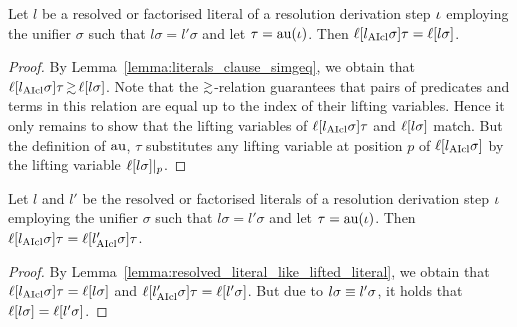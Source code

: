 \documentclass[,%
	draft=false,%
	numbers=noendperiod
	11pt,
	a4paper,
	oneside,%
	openany,
]{memoir}
\begin{document}
\begin{lemma}
	\label{lemma:resolved_literal_like_lifted_literal}
	Let $l$ be a resolved or factorised literal of a resolution derivation step $\iota$ employing the unifier $\sigma$ such that $l\sigma = l'\sigma$ and let $\tau =\nolinebreak \aiu(\inference)$.
	Then $\ell[l_{\operatorname{AIcl}}\sigma]\tau = \ell[l\sigma]$.
\end{lemma}
\begin{proof}
	By Lemma~\ref{lemma:literals_clause_simgeq}, we obtain that
	$\lifboth{l\cl\sigma}\tau \simgeq \lifboth{l\sigma}$.
	Note that the $\simgeq$-\nolinebreak{}relation guarantees that pairs of predicates and terms in this relation are equal up to the index of their lifting variables.
	Hence it only remains to show that the lifting variables of $\ell[l_{\operatorname{AIcl}}\sigma]\tau$ and $\ell[l\sigma]$ match.
	But the definition of $\operatorname{au}$, $\tau$ substitutes any lifting variable at position $p$ of $\ell[l_{\operatorname{AIcl}}\sigma]$ by the lifting variable $\ell[l\sigma]|_{p}$.
\end{proof}


\begin{lemma}
	\label{lemma:resolved_literals_equal}
	Let $l$ and $l'$ be the resolved or factorised literals of a resolution derivation step $\iota$ employing the unifier $\sigma$ such that $l\sigma = l'\sigma$ and let $\tau =\nolinebreak \aiu(\inference)$.
	Then $\ell[l_{\operatorname{AIcl}}\sigma]\tau = \ell[l_{\operatorname{AIcl}}'\sigma]\tau$.
\end{lemma}
\begin{proof}
	By Lemma~\ref{lemma:resolved_literal_like_lifted_literal}, 
	we obtain that 
	$\ell[l_{\operatorname{AIcl}}\sigma]\tau = \ell[l\sigma]$ and
	$\ell[l'_{\operatorname{AIcl}}\sigma]\tau = \ell[l'\sigma]$.
	But due to $l\sigma \equiv l'\sigma$, it holds that
	$\ell[l\sigma] = \ell[l'\sigma]$.
\end{proof}
\end{document}
